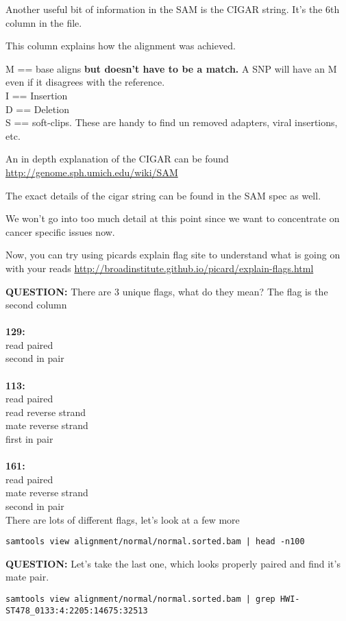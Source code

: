 Another useful bit of information in the SAM is the CIGAR string.
It's the 6th column in the file. 

This column explains how the alignment was achieved.
 
        M == base aligns \textbf{but doesn't have to be a match.} A SNP will have an M even if it disagrees with the reference.\\
        I == Insertion\\
        D == Deletion\\
        S == soft-clips. These are handy to find un removed adapters, viral insertions, etc.

An in depth explanation of the CIGAR can be found \url{http://genome.sph.umich.edu/wiki/SAM}

The exact details of the cigar string can be found in the SAM spec as well.


We won't go into too much detail at this point since we want to concentrate on cancer specific issues now.


Now, you can try using picards explain flag site to understand what is going on with your reads
\url{http://broadinstitute.github.io/picard/explain-flags.html}

\textbf{QUESTION:} There are 3 unique flags, what do they mean? The flag is the second column\\ \\
\textbf{129:}\\ 
    read paired\\
    second in pair\\ \\
\textbf{113:}\\
    read paired\\
    read reverse strand\\
    mate reverse strand\\
    first in pair\\ \\
\textbf{161:}\\
    read paired\\
    mate reverse strand\\
    second in pair\\

There are lots of different flags, let's look at a few more
\begin{lstlisting}
samtools view alignment/normal/normal.sorted.bam | head -n100
\end{lstlisting}


\textbf{QUESTION:} Let's take the last one, which looks properly paired and find it's mate pair. \\
[HINT: Instead of using 'head' what unix command could we pipe the otput to?]
\begin{lstlisting}
samtools view alignment/normal/normal.sorted.bam | grep HWI-ST478_0133:4:2205:14675:32513
\end{lstlisting}

